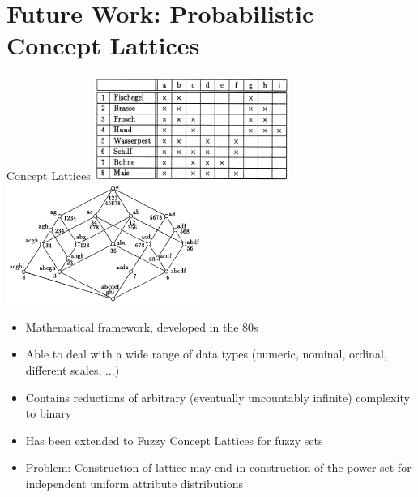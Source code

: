 \documentclass[rgb]{beamer}
\begin{document}
\section{Future Work: Probabilistic Concept Lattices}
    \begin{frame}[allowframebreaks]{Concept Lattices}
        \includegraphics[width=0.48\textwidth]{img/table_hasse.png}
        \includegraphics[width=0.48\textwidth]{img/hasse.png}
    \framebreak
        \begin{itemize}
            \item Mathematical framework, developed in the 80s
            \item Able to deal with a wide range of data types (numeric, nominal, ordinal, different scales, $\dots$)
            \item Contains reductions of arbitrary (eventually uncountably infinite) complexity to binary
            \item Has been extended to Fuzzy Concept Lattices for fuzzy sets
            \item Problem: Construction of lattice may end in construction of the power set for independent uniform attribute distributions
        \end{itemize}
    \end{frame}
    
\end{document}
